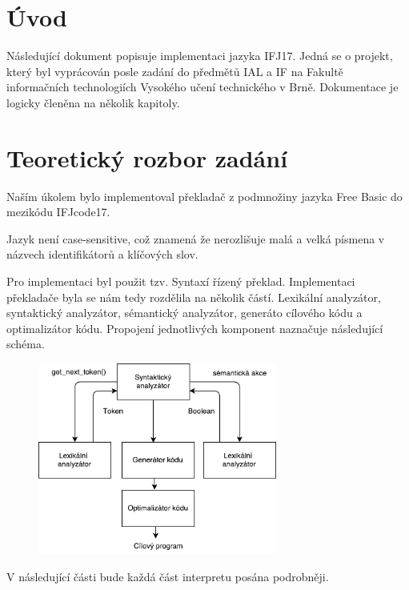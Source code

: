 \section{Úvod}
Následující dokument popisuje implementaci jazyka IFJ17. Jedná se o projekt,
který byl vyprácován posle zadání do předmětů IAL a IF na Fakultě
informačních technologiích Vysokého učení technického v Brně.
Dokumentace je logicky členěna na několik kapitoly.
\section{Teoretický rozbor zadání}
Naším úkolem bylo implementoval překladač z podmnožiny jazyka Free Basic
do mezikódu IFJcode17.

Jazyk není case-sensitive, což znamená že nerozlišuje malá a velká
písmena v názvech identifikátorů a klíčových slov.

Pro implementaci byl použit tzv. Syntaxí řízený překlad.
Implementaci překladače byla se nám tedy rozdělila na několik částí.
Lexikální analyzátor, syntaktický analyzátor, sémantický analyzátor,
generáto cílového kódu a optimalizátor kódu. Propojení jednotlivých
komponent naznačuje následující schéma.
\vspace*{16px}
\begin{figure}[htbp]
\centering
\includegraphics[width=0.7\textwidth, angle=0]{src/assets/structure.pdf}
\end{figure}

V následující části bude každá část interpretu posána podrobněji.